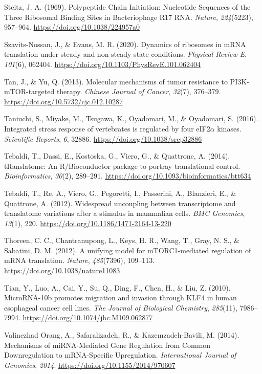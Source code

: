 \documentclass[12pt,openany]{book}
\begin{document}
\hypertarget{ref-Steitz1969}{}
Steitz, J. A. (1969). Polypeptide Chain Initiation: Nucleotide Sequences
of the Three Ribosomal Binding Sites in Bacteriophage R17 RNA.
\emph{Nature}, \emph{224}(5223), 957--964.
\url{https://doi.org/10.1038/224957a0}

\hypertarget{ref-Szavits-Nossan2020a}{}
Szavits-Nossan, J., \& Evans, M. R. (2020). Dynamics of ribosomes in
mRNA translation under steady and non-steady state conditions.
\emph{Physical Review E}, \emph{101}(6), 062404.
\url{https://doi.org/10.1103/PhysRevE.101.062404}

\hypertarget{ref-Tan2013}{}
Tan, J., \& Yu, Q. (2013). Molecular mechanisms of tumor resistance to
PI3K-mTOR-targeted therapy. \emph{Chinese Journal of Cancer},
\emph{32}(7), 376--379. \url{https://doi.org/10.5732/cjc.012.10287}

\hypertarget{ref-Taniuchi2016}{}
Taniuchi, S., Miyake, M., Tsugawa, K., Oyadomari, M., \& Oyadomari, S.
(2016). Integrated stress response of vertebrates is regulated by four
eIF2\(\alpha\) kinases. \emph{Scientific Reports}, \emph{6}, 32886.
\url{https://doi.org/10.1038/srep32886}

\hypertarget{ref-Tebaldi2014}{}
Tebaldi, T., Dassi, E., Kostoska, G., Viero, G., \& Quattrone, A.
(2014). tRanslatome: An R/Bioconductor package to portray translational
control. \emph{Bioinformatics}, \emph{30}(2), 289--291.
\url{https://doi.org/10.1093/bioinformatics/btt634}

\hypertarget{ref-Tebaldi2012}{}
Tebaldi, T., Re, A., Viero, G., Pegoretti, I., Passerini, A., Blanzieri,
E., \& Quattrone, A. (2012). Widespread uncoupling between transcriptome
and translatome variations after a stimulus in mammalian cells.
\emph{BMC Genomics}, \emph{13}(1), 220.
\url{https://doi.org/10.1186/1471-2164-13-220}

\hypertarget{ref-Thoreen2012}{}
Thoreen, C. C., Chantranupong, L., Keys, H. R., Wang, T., Gray, N. S.,
\& Sabatini, D. M. (2012). A unifying model for mTORC1-mediated
regulation of mRNA translation. \emph{Nature}, \emph{485}(7396),
109--113. \url{https://doi.org/10.1038/nature11083}

\hypertarget{ref-Tian2010}{}
Tian, Y., Luo, A., Cai, Y., Su, Q., Ding, F., Chen, H., \& Liu, Z.
(2010). MicroRNA-10b promotes migration and invasion through KLF4 in
human esophageal cancer cell lines. \emph{The Journal of Biological
Chemistry}, \emph{285}(11), 7986--7994.
\url{https://doi.org/10.1074/jbc.M109.062877}

\hypertarget{ref-ValinezhadOrang2014}{}
Valinezhad Orang, A., Safaralizadeh, R., \& Kazemzadeh-Bavili, M.
(2014). Mechanisms of miRNA-Mediated Gene Regulation from Common
Downregulation to mRNA-Specific Upregulation. \emph{International
Journal of Genomics}, \emph{2014}.
\url{https://doi.org/10.1155/2014/970607}
\end{document}
